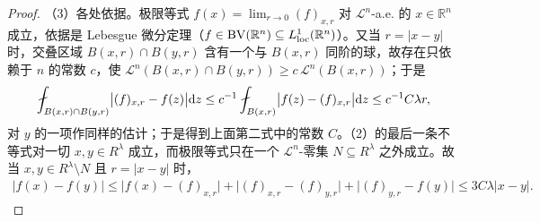 \documentclass[../../main.tex]{subfiles}%
\begin{document}
\begin{proof}
（3）各处依据。极限等式 $f(x)=\lim_{r\to0}(f)_{x,r}$ 对 $\mathcal{L}^n$-a.e. 的 $x\in\mathbb{R}^n$ 成立，依据是 Lebesgue 微分定理（$f\in\mathrm{BV}(\mathbb{R}^n)\subseteq L^1_{\mathrm{loc}}(\mathbb{R}^n)$）。又当 $r=\lvert x-y\rvert$ 时，交叠区域 $B(x,r)\cap B(y,r)$ 含有一个与 $B(x,r)$ 同阶的球，故存在只依赖于 $n$ 的常数 $c$，使 $\mathcal{L}^n(B(x,r)\cap B(y,r))\ge c\,\mathcal{L}^n(B(x,r))$；于是
\begin{align*}
\fint_{B(x,r)\cap B(y,r)}\bigl\lvert(f)_{x,r}-f(z)\bigr\rvert\diff z\le c^{-1}\fint_{B(x,r)}\bigl\lvert f(z)-(f)_{x,r}\bigr\rvert\diff z\le c^{-1}C\lambda r,
\end{align*}
对 $y$ 的一项作同样的估计；于是得到上面第二式中的常数 $C$。（2）的最后一条不等式对一切 $x,y\in R^\lambda$ 成立，而极限等式只在一个 $\mathcal{L}^n$-零集 $N\subseteq R^\lambda$ 之外成立。故当 $x,y\in R^\lambda\setminus N$ 且 $r=\lvert x-y\rvert$ 时，
\begin{align*}
\lvert f(x)-f(y)\rvert\le\lvert f(x)-(f)_{x,r}\rvert+\bigl\lvert(f)_{x,r}-(f)_{y,r}\bigr\rvert+\bigl\lvert(f)_{y,r}-f(y)\bigr\rvert\le3C\lambda\lvert x-y\rvert .
\end{align*}


\end{proof}
\end{document}
